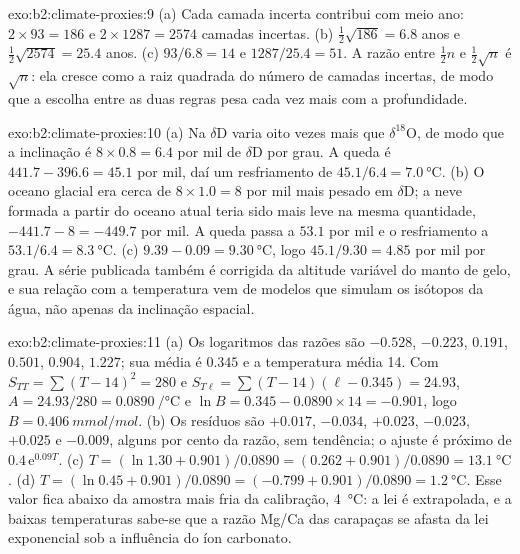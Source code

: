 \begin{solution}{exo:b2:climate-proxies:9}
(a) Cada camada incerta contribui com meio ano: $2 \times 93 = 186$ e $2 \times 1287 = 2574$
camadas incertas. (b) $\frac12\sqrt{186} = 6.8$ anos e $\frac12\sqrt{2574} = 25.4$ anos.
(c) $93/6.8 = 14$ e $1287/25.4 = 51$. A razão entre $\frac12 n$ e $\frac12\sqrt{n}$ é
$\sqrt{n}$: ela cresce como a raiz quadrada do número de camadas incertas, de modo que a escolha entre
as duas regras pesa cada vez mais com a profundidade.
\end{solution}

\begin{solution}{exo:b2:climate-proxies:10}
(a) Na  $\delta$D varia oito vezes mais que $\delta^{18}$O, de modo que a
inclinação é $8 \times 0.8 = 6.4$ por mil de $\delta$D por grau. A queda é $441.7 - 396.6 = 45.1$
por mil, daí um resfriamento de $45.1/6.4 = \qty{7.0}{\celsius}$. (b) O oceano glacial era cerca de
$8 \times 1.0 = 8$ por mil mais pesado em $\delta$D; a neve formada a partir do oceano atual teria sido
mais leve na mesma quantidade, $-441.7 - 8 = -449.7$ por mil. A queda passa a $53.1$ por mil e o resfriamento a
$53.1/6.4 = \qty{8.3}{\celsius}$. (c) $9.39 - 0.09 = \qty{9.30}{\celsius}$, logo $45.1/9.30 = 4.85$
por mil por grau. A série publicada também é corrigida da altitude variável do manto
de gelo, e sua relação com a temperatura vem de modelos que simulam os isótopos da água, não apenas
da inclinação espacial.
\end{solution}

\begin{solution}{exo:b2:climate-proxies:11}
(a) Os logaritmos das razões são $-0.528$, $-0.223$, $0.191$, $0.501$, $0.904$, $1.227$; sua
média é $0.345$ e a temperatura média 14. Com $S_{TT} = \sum (T - 14)^2 = 280$ e $S_{T\ell} =
\sum (T - 14)(\ell - 0.345) = 24.93$, $A = 24.93/280 = \qty{0.0890}{\per\celsius}$ e $\ln B =
0.345 - 0.0890 \times 14 = -0.901$, logo $B = \qty{0.406}{mmol/mol}$. (b) Os resíduos são
$+0.017$, $-0.034$, $+0.023$, $-0.023$, $+0.025$ e $-0.009$, alguns por cento da razão, sem
tendência; o ajuste é próximo de $0.4\,\mathrm{e}^{0.09T}$. (c) $T = (\ln 1.30 + 0.901)/0.0890 = (0.262 +
0.901)/0.0890 = \qty{13.1}{\celsius}$. (d) $T = (\ln 0.45 + 0.901)/0.0890 = (-0.799 +
0.901)/0.0890 = \qty{1.2}{\celsius}$. Esse valor fica abaixo da amostra mais fria da calibração,
\qty{4}{\celsius}: a lei é extrapolada, e a baixas temperaturas sabe-se que a razão Mg/Ca das carapaças
se afasta da lei exponencial sob a influência do íon carbonato.
\end{solution}

